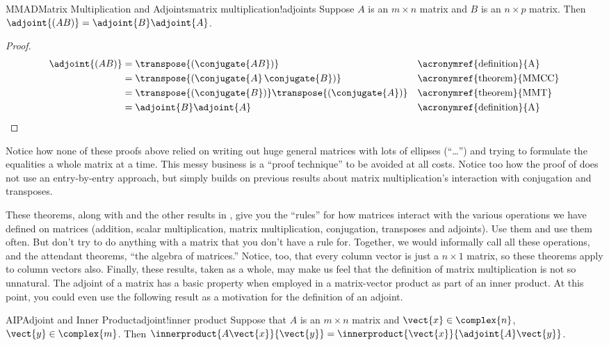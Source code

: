 %
\begin{theorem}{MMAD}{Matrix Multiplication and Adjoints}{matrix multiplication!adjoints}
Suppose $A$ is an $m\times n$ matrix and $B$ is an $n\times p$ matrix.  Then $\adjoint{(AB)}=\adjoint{B}\adjoint{A}$.
\end{theorem}
%
\begin{proof}
%
\begin{align*}
\adjoint{(AB)}
&=\transpose{\left(\conjugate{AB}\right)}&&\text{\acronymref{definition}{A}}\\
&=\transpose{\left(\conjugate{A}\,\conjugate{B}\right)}&&\text{\acronymref{theorem}{MMCC}}\\
&=\transpose{\left(\conjugate{B}\right)}\transpose{\left(\conjugate{A}\right)}&&\text{\acronymref{theorem}{MMT}}\\
&=\adjoint{B}\adjoint{A}&&\text{\acronymref{definition}{A}}
\end{align*}
%
\end{proof}
%
Notice how none of these proofs above relied on writing out huge general matrices with lots of ellipses (``\dots'') and trying to formulate the equalities a whole matrix at a time.  This messy business is a ``proof technique'' to be avoided at all costs.  Notice too how the proof of  does not use an entry-by-entry approach, but simply builds on previous results about matrix multiplication's interaction with conjugation and transposes.\par
%
These theorems, along with  and the other results in , give you the ``rules'' for how matrices interact with the various operations we have defined on matrices (addition, scalar multiplication, matrix multiplication, conjugation, transposes and adjoints).  Use them and use them often.  But don't try to do anything with a matrix that you don't have a rule for.  Together, we would informally call all these operations, and the attendant theorems, ``the algebra of matrices.''  Notice, too, that every column vector is just a $n\times 1$ matrix, so these theorems apply to column vectors also.  Finally, these results, taken as a whole, may make us feel that the definition of matrix multiplication is not so unnatural.
%
%
The adjoint of a matrix has a basic property when employed in a matrix-vector product as part of an inner product.  At this point, you could even use the following result as a motivation for the definition of an adjoint.
%
\begin{theorem}{AIP}{Adjoint and Inner Product}{adjoint!inner product}
Suppose that $A$ is an $m\times n$ matrix and $\vect{x}\in\complex{n}$, $\vect{y}\in\complex{m}$.  Then $\innerproduct{A\vect{x}}{\vect{y}}=\innerproduct{\vect{x}}{\adjoint{A}\vect{y}}$.
\end{theorem}
